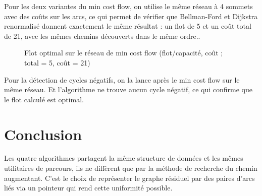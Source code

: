 \documentclass[11pt,a4paper]{article}
\begin{document}
\medskip
Pour les deux variantes du min cost flow, on utilise le même réseau à 4 sommets avec des coûts sur les arcs, ce qui permet de vérifier que Bellman-Ford et Dijkstra renormalisé donnent exactement le même résultat : un flot de 5 et un coût total de 21, avec les mêmes chemins découverts dans le même ordre..

\begin{figure}[h]
    \centering
    \caption{Flot optimal sur le réseau de min cost flow (flot/capacité, coût ; total = 5, coût = 21)}
\end{figure}

\medskip
Pour la détection de cycles négatifs, on la lance après le min cost flow sur le même réseau. Et l'algorithme ne trouve aucun cycle négatif, ce qui confirme que le flot calculé est optimal.


\section{Conclusion}

Les quatre algorithmes partagent la même structure de données et les mêmes utilitaires de parcours, ils ne diffèrent que par la méthode de recherche du chemin augmentant. C'est le choix de représenter le graphe résiduel par des paires d'arcs liés via un pointeur qui rend cette uniformité possible.
\end{document}
